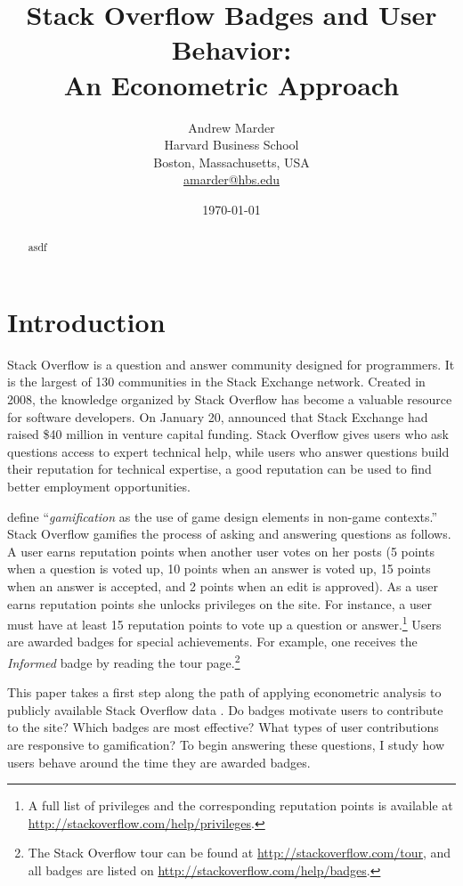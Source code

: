 \documentclass[conference]{IEEEtran}
\title{
  Stack Overflow Badges and User Behavior: \\
  An Econometric Approach
}
\author{
  Andrew Marder \\
  Harvard Business School \\
  Boston, Massachusetts, USA \\
  \href{mailto:amarder@hbs.edu}{amarder@hbs.edu}
}
\date{\today}
\newcommand{\1}{\mathds{1}}
\begin{document}
\maketitle

\begin{abstract}
asdf
\end{abstract}

\section{Introduction}

Stack Overflow is a question and answer community designed for programmers. It is the largest of 130 communities in the Stack Exchange network. Created in 2008, the knowledge organized by Stack Overflow has become a valuable resource for software developers. On January 20, \citet{Spoelsky2015} announced that Stack Exchange had raised \$40 million in venture capital funding. Stack Overflow gives users who ask questions access to expert technical help, while users who answer questions build their reputation for technical expertise, a good reputation can be used to find better employment opportunities.

\citet{Deterding2011} define ``\textit{gamification} as the use of game design elements in non-game contexts.'' Stack Overflow gamifies the process of asking and answering questions as follows. A user earns reputation points when another user votes on her posts (5 points when a question is voted up, 10 points when an answer is voted up, 15 points when an answer is accepted, and 2 points when an edit is approved). As a user earns reputation points she unlocks privileges on the site. For instance, a user must have at least 15 reputation points to vote up a question or answer.\footnote{A full list of privileges and the corresponding reputation points is available at \url{http://stackoverflow.com/help/privileges}.} Users are awarded badges for special achievements. For example, one receives the \textit{Informed} badge by reading the tour page.\footnote{The Stack Overflow tour can be found at \url{http://stackoverflow.com/tour}, and all badges are listed on \url{http://stackoverflow.com/help/badges}.}

This paper takes a first step along the path of applying econometric analysis to publicly available Stack Overflow data \cite{se-dump}. Do badges motivate users to contribute to the site? Which badges are most effective? What types of user contributions are responsive to gamification? To begin answering these questions, I study how users behave around the time they are awarded badges.
\end{document}
